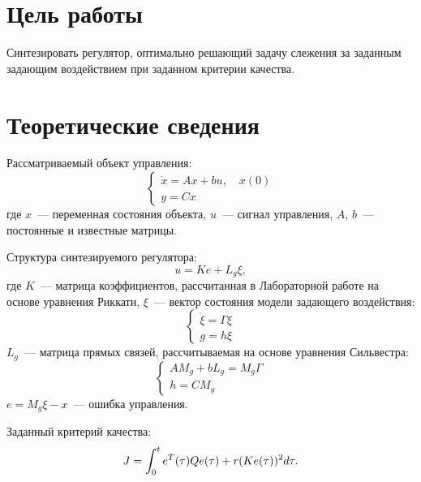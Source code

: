 \section{Цель работы}
Синтезировать регулятор, оптимально решающий задачу слежения за заданным задающим воздействием при заданном критерии качества.

\section{Теоретические сведения}
Рассматриваемый объект управления:
\begin{equation}
	\begin{cases}
	    \dot{x} = A x + b u, \quad x(0)\\
		y = C x
	\end{cases}
\end{equation}
где $x$~--- переменная состояния объекта, $u$~--- сигнал управления, $A$, $b$~--- постоянные и известные матрицы.

Структура синтезируемого регулятора:
\begin{equation}\label{eq_tuned_controller}
    u = K e + L_g \xi,
\end{equation}
где $K$~--- матрица коэффициентов, рассчитанная в Лабораторной работе  на основе уравнения Риккати, $\xi$~--- вектор состояния модели задающего воздействия:
\begin{equation}
\begin{cases}
\dot \xi = \Gamma \xi\\
g = h \xi
\end{cases}
\end{equation}
$L_g$~--- матрица прямых связей, рассчитываемая на основе уравнения Сильвестра:
\begin{equation}
	\begin{cases}
		A M_g + b L_g = M_g \Gamma \\
		h = C M_g
	\end{cases}
\end{equation}
$e = M_g \xi - x$~--- ошибка управления.

Заданный критерий качества:
\begin{equation}\label{criteriy}
    J = \int_0^t e^T(\tau) Q e(\tau) + r (K e(\tau))^2 d\tau \ldotp
\end{equation}


